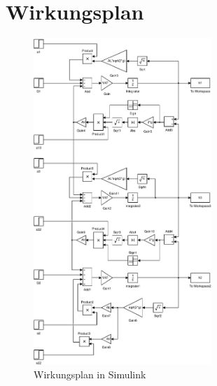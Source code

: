 \section{Wirkungsplan}
\begin{figure}[h!]
    \centering
    \includegraphics[width=0.6\textwidth]{03/wirkungsplan_mdl.pdf}
    \caption{Wirkungsplan in Simulink}
    \label{fig:03_mdl}
\end{figure}
